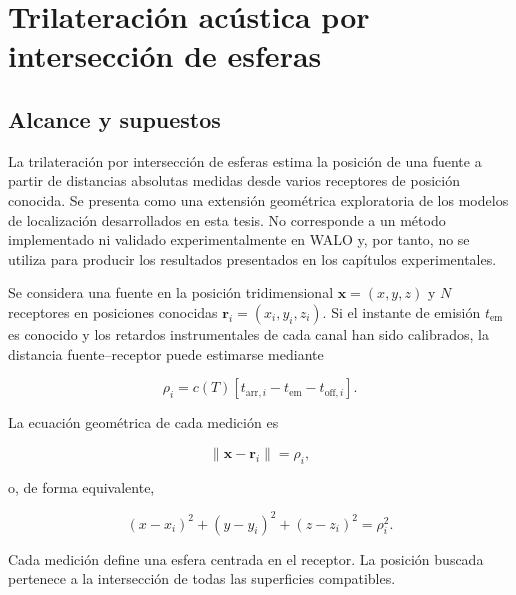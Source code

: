 \chapter{Trilateración acústica por intersección de esferas}
\label{app:trilateracion_esferas}

\section{Alcance y supuestos}

La trilateración por intersección de esferas estima la posición de una
fuente a partir de distancias absolutas medidas desde varios receptores
de posición conocida. Se presenta como una extensión geométrica
exploratoria de los modelos de localización desarrollados en esta tesis.
No corresponde a un método implementado ni validado experimentalmente
en WALO y, por tanto, no se utiliza para producir los resultados
presentados en los capítulos experimentales.

Se considera una fuente en la posición tridimensional
$\mathbf{x}=(x,y,z)$ y $N$ receptores en posiciones conocidas
$\mathbf{r}_i=(x_i,y_i,z_i)$. Si el instante de emisión
$t_{\mathrm{em}}$ es conocido y los retardos instrumentales de cada
canal han sido calibrados, la distancia fuente--receptor puede
estimarse mediante

\begin{equation}
    \rho_i = c(T)\left[
    t_{\mathrm{arr},i}-t_{\mathrm{em}}-t_{\mathrm{off},i}
    \right].
    \label{eq:app_esfera_distancia}
\end{equation}

La ecuación geométrica de cada medición es

\begin{equation}
    \|\mathbf{x}-\mathbf{r}_i\|=\rho_i,
    \label{eq:app_esfera_general}
\end{equation}

o, de forma equivalente,

\begin{equation}
    (x-x_i)^2+(y-y_i)^2+(z-z_i)^2=\rho_i^2.
    \label{eq:app_esfera_expandida}
\end{equation}

Cada medición define una esfera centrada en el receptor. La posición
buscada pertenece a la intersección de todas las superficies
compatibles.


